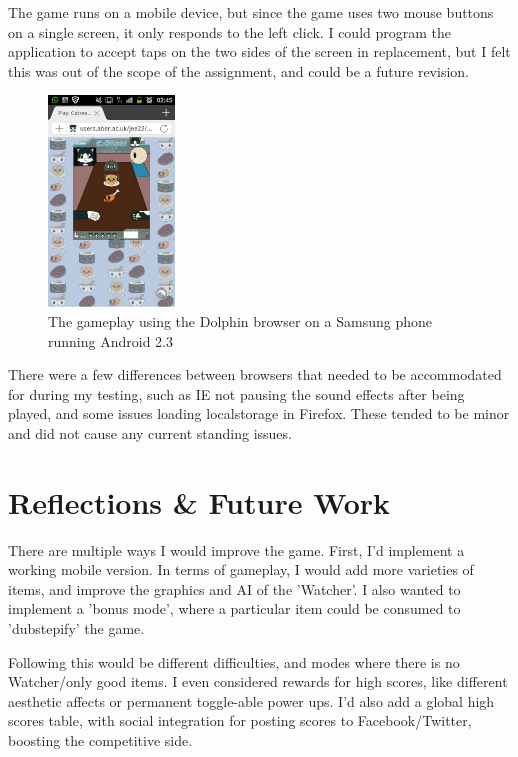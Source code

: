 \documentclass{article}
\begin{document}
The game runs on a mobile device, but since the game uses two mouse buttons on a single screen, it only responds to the left click. I could program the application to accept taps on the two sides of the screen in replacement, but I felt this was out of the scope of the assignment, and could be a future revision.

        \begin{figure}[H]
	\centering
                \includegraphics[width=0.3\textwidth]{img/testing/phone.jpg}
                \caption{The gameplay using the Dolphin browser on a Samsung phone running Android 2.3}
                \label{fig:phone}
        \end{figure}

There were a few differences between browsers that needed to be accommodated for during my testing, such as IE not pausing the sound effects after being played, and some issues loading localstorage in Firefox. These tended to be minor and did not cause any current standing issues.


\section{Reflections \& Future Work}
There are multiple ways I would improve the game. First, I'd implement a working mobile version. In terms of gameplay, I would add more varieties of items, and improve the graphics and AI of the 'Watcher'. I also wanted to implement a 'bonus mode', where a particular item could be consumed to 'dubstepify' the game.

Following this would be different difficulties, and modes where there is no Watcher/only good items. I even considered rewards for high scores, like different aesthetic affects or permanent toggle-able power ups. I'd also add a global high scores table, with social integration for posting scores to Facebook/Twitter, boosting the competitive side.
\end{document}
